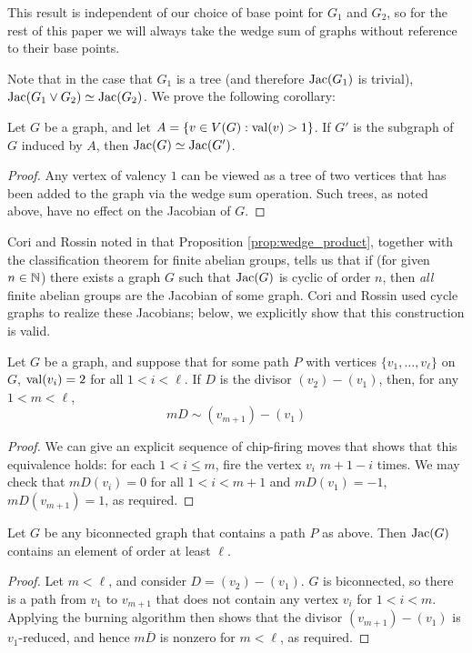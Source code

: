 \documentclass{amsart}
\begin{document}
This result is independent of our choice of base point for $G_1$ and
$G_2$, so for the rest of this paper we will always take the wedge sum
of graphs without reference to their base points.

Note that in the case that $G_1$ is a tree (and therefore $\operatorname{Jac}(G_1)$
is trivial), $\operatorname{Jac}(G_1 \vee G_2) \simeq \operatorname{Jac}(G_2)$. We prove the
following corollary:
\begin{cor}
  \label{cor:1_valent}
  Let $G$ be a graph, and let $A = \{v \in V(G) : \operatorname{val}(v) > 1\}$. If
  $G'$ is the subgraph of $G$ induced by $A$, then $\operatorname{Jac}(G) \simeq
  \operatorname{Jac}(G')$.
\end{cor}

\begin{proof}
  Any vertex of valency $1$ can be viewed as a tree of two vertices
  that has been added to the graph via the wedge sum operation. Such
  trees, as noted above, have no effect on the Jacobian of $G$.
\end{proof}

Cori and Rossin noted in \cite{CR2000} that Proposition
\ref{prop:wedge_product}, together with the classification theorem for
finite abelian groups, tells us that if (for given $n \in \mathbb{N}$) there
exists a graph $G$ such that $\operatorname{Jac}(G)$ is cyclic of order $n$, then
\emph{all} finite abelian groups are the Jacobian of some graph. Cori
and Rossin used cycle graphs to realize these Jacobians; below, we
explicitly show that this construction is valid.

\begin{lem}
  \label{lem:2valent_path}
  Let $G$ be a graph, and suppose that for some path $P$ with vertices
  $\{v_1, \ldots, v_\ell\}$ on $G$, $\operatorname{val}(v_i) = 2$ for all $1 < i <
  \ell$. If $D$ is the divisor $(v_2) - (v_1)$, then, for any $1 < m <
  \ell$,
  \begin{equation*}
    mD \sim (v_{m+1}) - (v_1)
  \end{equation*}
\end{lem}
\begin{proof}
  We can give an explicit sequence of chip-firing moves that shows
  that this equivalence holds: for each $1 < i \le m$, fire the vertex
  $v_i$ $m + 1 - i$ times. We may check that $mD(v_i) = 0$ for all $1
  < i < m+1$ and $mD(v_1) = -1$, $mD(v_{m+1}) = 1$, as required.
\end{proof}

\begin{cor}
  \label{cor:2valent_path}
  Let $G$ be any biconnected graph that contains a path $P$ as
  above. Then $\operatorname{Jac}(G)$ contains an element of order at least $\ell$.
\end{cor}
\begin{proof}
  Let $m < \ell$, and consider $D = (v_2) - (v_1)$. $G$ is
  biconnected, so there is a path from $v_1$ to $v_{m+1}$ that does
  not contain any vertex $v_i$ for $1 < i < m$. Applying the burning
  algorithm then shows that the divisor $(v_{m+1}) - (v_1)$ is
  $v_1$-reduced, and hence $m\overline{D}$ is nonzero for $m < \ell$,
  as required.
\end{proof}
\end{document}
